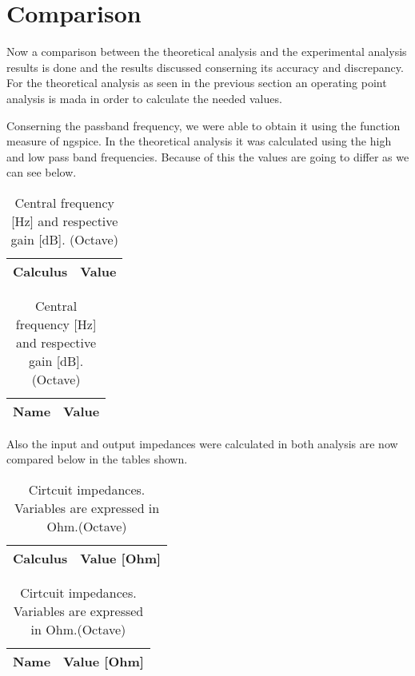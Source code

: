 \section{Comparison}
\label{section:comparison}

\par Now a comparison between the theoretical analysis and the experimental analysis results is done and the results discussed conserning its accuracy and discrepancy. For the theoretical analysis as seen in the previous section an operating point analysis is mada in order to calculate the needed values.
 
 \par Conserning the passband frequency, we were able to obtain it using the function measure of ngspice. In the theoretical analysis it was calculated using the high and low pass band frequencies. Because of this the values are going to differ as we can see below.

 \begin{table}[h]
\parbox{.45\linewidth}{
  \centering
  \begin{tabular}{|l|r|}
    \hline    
    {\bf Calculus} & {\bf Value} \\ \hline
    
  \end{tabular}
  \caption{Central frequency [Hz] and respective gain [dB]. (Ngspice)}} 
\parbox{.45\linewidth}{
 \centering
  \begin{tabular}{|l|r|}
    \hline    
    {\bf Name} & {\bf Value} \\ \hline
    
  \end{tabular}
  \caption{Central frequency [Hz] and respective gain [dB]. (Octave)}}
\end{table}

\par Also the input and output impedances were calculated in both analysis are now compared below in the tables shown.

\begin{table}[ht]
\parbox{.45\linewidth}{
  \centering
  \begin{tabular}{|l|r|}
    \hline    
    {\bf Calculus} & {\bf Value [Ohm]} \\ \hline
    
  \end{tabular}
  \caption{Cirtcuit impedances. Variables are expressed in Ohm.(Ngspice)}} 
\parbox{.45\linewidth}{
 \centering
  \begin{tabular}{|l|r|}
    \hline    
    {\bf Name} & {\bf Value [Ohm]} \\ \hline
    
  \end{tabular}
  \caption{Cirtcuit impedances. Variables are expressed in Ohm.(Octave)}}
\end{table}

